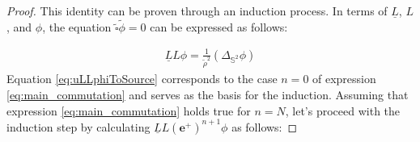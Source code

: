 \begin{proof}
  This identity can be proven through an induction process. In terms of $\underline{L}$, $L$, and $\phi$, the equation $\tilde{\square}\tilde{\phi}=0$ can be expressed as follows:

\begin{align}\label{eq:uLLphiToSource}
  \underline{L} L \phi = \frac{1}{\tilde{\rho}^2}(\Delta_{\mathbb{S}^2} \phi)
\end{align}
Equation \eqref{eq:uLLphiToSource} corresponds to the case $n=0$ of expression \eqref{eq:main_commutation} and serves as the basis for the induction. Assuming that expression \eqref{eq:main_commutation} holds true for $n=N$, let's proceed with the induction step by calculating $\underline{L} L (\boldsymbol{e}^+)^{n+1} \phi$ as follows:

\setlength{\jot}{10pt}



\end{proof}
